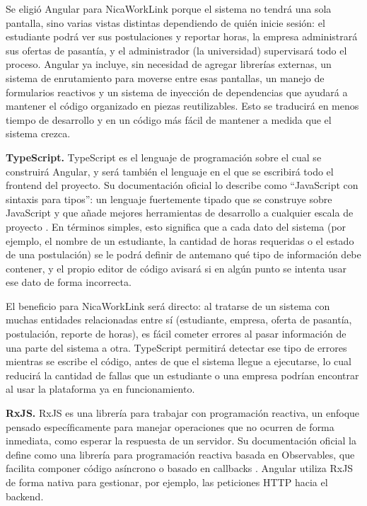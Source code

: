 Se eligió Angular para NicaWorkLink porque el sistema no tendrá una sola pantalla, sino varias vistas distintas dependiendo de quién inicie sesión: el estudiante podrá ver sus postulaciones y reportar horas, la empresa administrará sus ofertas de pasantía, y el administrador (la universidad) supervisará todo el proceso. Angular ya incluye, sin necesidad de agregar librerías externas, un sistema de enrutamiento para moverse entre esas pantallas, un manejo de formularios reactivos y un sistema de inyección de dependencias que ayudará a mantener el código organizado en piezas reutilizables. Esto se traducirá en menos tiempo de desarrollo y en un código más fácil de mantener a medida que el sistema crezca.

\textbf{TypeScript.} TypeScript es el lenguaje de programación sobre el cual se construirá Angular, y será también el lenguaje en el que se escribirá todo el frontend del proyecto. Su documentación oficial lo describe como ``JavaScript con sintaxis para tipos'': un lenguaje fuertemente tipado que se construye sobre JavaScript y que añade mejores herramientas de desarrollo a cualquier escala de proyecto \parencite{typescript}. En términos simples, esto significa que a cada dato del sistema (por ejemplo, el nombre de un estudiante, la cantidad de horas requeridas o el estado de una postulación) se le podrá definir de antemano qué tipo de información debe contener, y el propio editor de código avisará si en algún punto se intenta usar ese dato de forma incorrecta.

El beneficio para NicaWorkLink será directo: al tratarse de un sistema con muchas entidades relacionadas entre sí (estudiante, empresa, oferta de pasantía, postulación, reporte de horas), es fácil cometer errores al pasar información de una parte del sistema a otra. TypeScript permitirá detectar ese tipo de errores mientras se escribe el código, antes de que el sistema llegue a ejecutarse, lo cual reducirá la cantidad de fallas que un estudiante o una empresa podrían encontrar al usar la plataforma ya en funcionamiento.

\textbf{RxJS.} RxJS es una librería para trabajar con programación reactiva, un enfoque pensado específicamente para manejar operaciones que no ocurren de forma inmediata, como esperar la respuesta de un servidor. Su documentación oficial la define como una librería para programación reactiva basada en Observables, que facilita componer código asíncrono o basado en callbacks \parencite{rxjs}. Angular utiliza RxJS de forma nativa para gestionar, por ejemplo, las peticiones HTTP hacia el backend.

